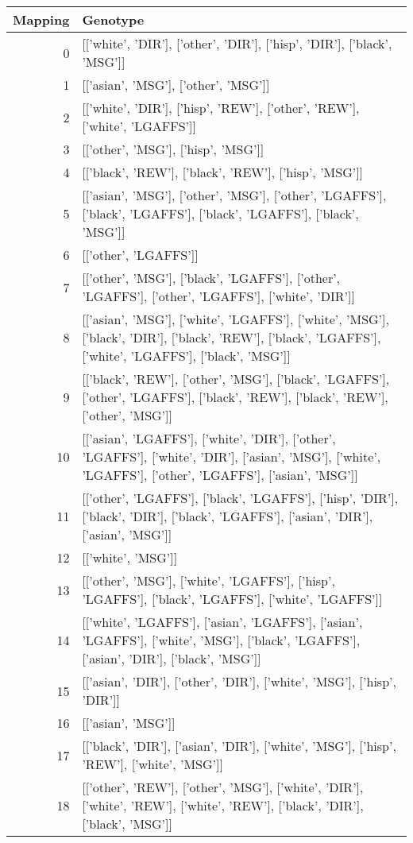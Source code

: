 \begin{tabular}{rl}
\toprule
Mapping & Genotype \\
\midrule
0 & [['white', 'DIR'], ['other', 'DIR'], ['hisp', 'DIR'], ['black', 'MSG']] \\
1 & [['asian', 'MSG'], ['other', 'MSG']] \\
2 & [['white', 'DIR'], ['hisp', 'REW'], ['other', 'REW'], ['white', 'LGAFFS']] \\
3 & [['other', 'MSG'], ['hisp', 'MSG']] \\
4 & [['black', 'REW'], ['black', 'REW'], ['hisp', 'MSG']] \\
5 & [['asian', 'MSG'], ['other', 'MSG'], ['other', 'LGAFFS'], ['black', 'LGAFFS'], ['black', 'LGAFFS'], ['black', 'MSG']] \\
6 & [['other', 'LGAFFS']] \\
7 & [['other', 'MSG'], ['black', 'LGAFFS'], ['other', 'LGAFFS'], ['other', 'LGAFFS'], ['white', 'DIR']] \\
8 & [['asian', 'MSG'], ['white', 'LGAFFS'], ['white', 'MSG'], ['black', 'DIR'], ['black', 'REW'], ['black', 'LGAFFS'], ['white', 'LGAFFS'], ['black', 'MSG']] \\
9 & [['black', 'REW'], ['other', 'MSG'], ['black', 'LGAFFS'], ['other', 'LGAFFS'], ['black', 'REW'], ['black', 'REW'], ['other', 'MSG']] \\
10 & [['asian', 'LGAFFS'], ['white', 'DIR'], ['other', 'LGAFFS'], ['white', 'DIR'], ['asian', 'MSG'], ['white', 'LGAFFS'], ['other', 'LGAFFS'], ['asian', 'MSG']] \\
11 & [['other', 'LGAFFS'], ['black', 'LGAFFS'], ['hisp', 'DIR'], ['black', 'DIR'], ['black', 'LGAFFS'], ['asian', 'DIR'], ['asian', 'MSG']] \\
12 & [['white', 'MSG']] \\
13 & [['other', 'MSG'], ['white', 'LGAFFS'], ['hisp', 'LGAFFS'], ['black', 'LGAFFS'], ['white', 'LGAFFS']] \\
14 & [['white', 'LGAFFS'], ['asian', 'LGAFFS'], ['asian', 'LGAFFS'], ['white', 'MSG'], ['black', 'LGAFFS'], ['asian', 'DIR'], ['black', 'MSG']] \\
15 & [['asian', 'DIR'], ['other', 'DIR'], ['white', 'MSG'], ['hisp', 'DIR']] \\
16 & [['asian', 'MSG']] \\
17 & [['black', 'DIR'], ['asian', 'DIR'], ['white', 'MSG'], ['hisp', 'REW'], ['white', 'MSG']] \\
18 & [['other', 'REW'], ['other', 'MSG'], ['white', 'DIR'], ['white', 'REW'], ['white', 'REW'], ['black', 'DIR'], ['black', 'MSG']] \\

\end{tabular}
